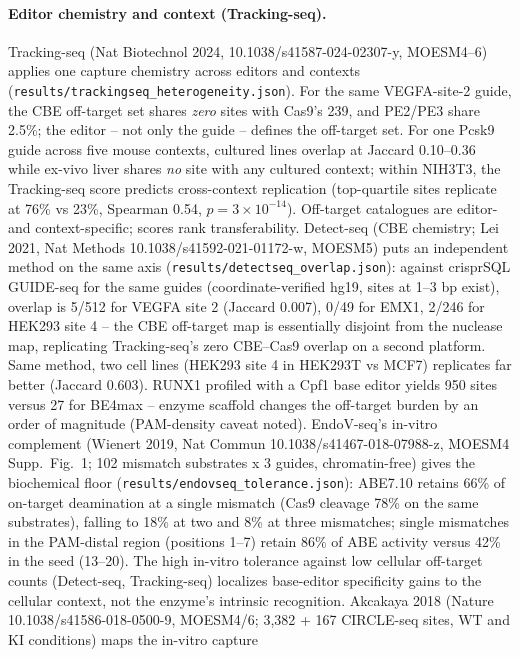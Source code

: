 \documentclass[12pt]{article}
\begin{document}
\paragraph{Editor chemistry and context (Tracking-seq).} Tracking-seq
(Nat Biotechnol 2024, 10.1038/s41587-024-02307-y, MOESM4--6) applies
one capture chemistry across editors and contexts
(\texttt{results/trackingseq\_heterogeneity.json}). For the same
VEGFA-site-2 guide, the CBE off-target set shares \emph{zero} sites
with Cas9's 239, and PE2/PE3 share 2.5\%; the editor -- not only the
guide -- defines the off-target set. For one Pcsk9 guide across five
mouse contexts, cultured lines overlap at Jaccard 0.10--0.36 while
ex-vivo liver shares \emph{no} site with any cultured context; within
NIH3T3, the Tracking-seq score predicts cross-context replication
(top-quartile sites replicate at 76\% vs 23\%, Spearman 0.54,
$p=3\times10^{-14}$). Off-target catalogues are editor- and
context-specific; scores rank transferability.
Detect-seq (CBE chemistry; Lei 2021, Nat Methods
10.1038/s41592-021-01172-w, MOESM5) puts an independent method on the
same axis (\texttt{results/detectseq\_overlap.json}): against crisprSQL
GUIDE-seq for the same guides (coordinate-verified hg19, sites at 1--3
bp exist), overlap is 5/512 for VEGFA site 2 (Jaccard 0.007), 0/49 for
EMX1, 2/246 for HEK293 site 4 -- the CBE off-target map is essentially
disjoint from the nuclease map, replicating Tracking-seq's zero
CBE--Cas9 overlap on a second platform. Same method, two cell lines
(HEK293 site 4 in HEK293T vs MCF7) replicates far better (Jaccard
0.603). RUNX1 profiled with a Cpf1 base editor yields 950 sites versus
27 for BE4max -- enzyme scaffold changes the off-target burden by an
order of magnitude (PAM-density caveat noted).
EndoV-seq's in-vitro complement (Wienert 2019, Nat Commun
10.1038/s41467-018-07988-z, MOESM4 Supp.\ Fig.\ 1; 102 mismatch
substrates x 3 guides, chromatin-free) gives the biochemical floor
(\texttt{results/endovseq\_tolerance.json}): ABE7.10 retains 66\% of
on-target deamination at a single mismatch (Cas9 cleavage 78\% on the
same substrates), falling to 18\% at two and 8\% at three mismatches;
single mismatches in the PAM-distal region (positions 1--7) retain
86\% of ABE activity versus 42\% in the seed (13--20). The high
in-vitro tolerance against low cellular off-target counts (Detect-seq,
Tracking-seq) localizes base-editor specificity gains to the cellular
context, not the enzyme's intrinsic recognition.
Akcakaya 2018 (Nature 10.1038/s41586-018-0500-9, MOESM4/6; 3,382 +
167 CIRCLE-seq sites, WT and KI conditions) maps the in-vitro capture
\end{document}
